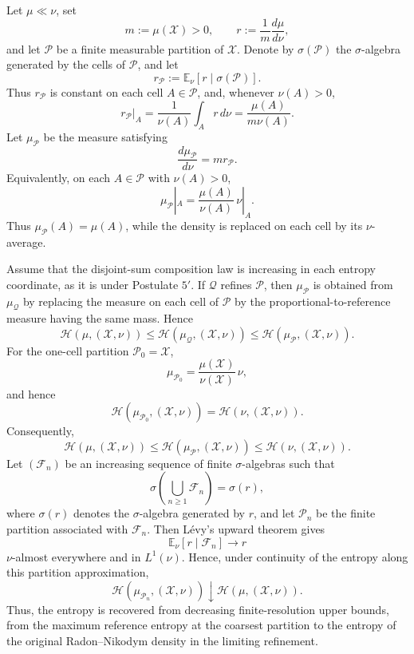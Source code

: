 \documentclass[reqno]{amsart}
\begin{document}
\begin{remark}
Let $\mu\ll\nu$, set
$$
m:=\mu(\mathcal X)>0,
\qquad
r:=\frac{1}{m}\frac{d\mu}{d\nu},
$$
and let $\mathcal P$ be a finite measurable partition of $\mathcal X$. Denote by
$\sigma(\mathcal P)$ the $\sigma$-algebra generated by the cells of $\mathcal P$, and let
$$
r_{\mathcal P}
:=
\mathbb E_\nu
\left[
r\mid\sigma(\mathcal P)
\right].
$$
Thus $r_{\mathcal P}$ is constant on each cell $A\in\mathcal P$, and, whenever
$\nu(A)>0$,
$$
r_{\mathcal P}|_A
=
\frac{1}{\nu(A)}
\int_A r\,d\nu
=
\frac{\mu(A)}{m\nu(A)}.
$$
Let $\mu_{\mathcal P}$ be the measure satisfying
$$
\frac{d\mu_{\mathcal P}}{d\nu}
=
mr_{\mathcal P}.
$$
Equivalently, on each $A\in\mathcal P$ with $\nu(A)>0$,
$$
\mu_{\mathcal P}|_A
=
\frac{\mu(A)}{\nu(A)}\,\nu|_A.
$$
Thus $\mu_{\mathcal P}(A)=\mu(A)$, while the density is replaced on each
cell by its $\nu$-average.

Assume that the disjoint-sum composition law is increasing in each
entropy coordinate, as it is under Postulate $5'$. If $\mathcal Q$
refines $\mathcal P$, then $\mu_{\mathcal P}$ is obtained from
$\mu_{\mathcal Q}$ by replacing the measure on each cell of
$\mathcal P$ by the proportional-to-reference measure having the same
mass. Hence
$$
\mathcal H(\mu,(\mathcal X,\nu))
\leq
\mathcal H(\mu_{\mathcal Q},(\mathcal X,\nu))
\leq
\mathcal H(\mu_{\mathcal P},(\mathcal X,\nu)).
$$
For the one-cell partition $\mathcal P_0={\mathcal X}$,
$$
\mu_{\mathcal P_0}
=
\frac{\mu(\mathcal X)}{\nu(\mathcal X)}\,\nu,
$$
and hence
$$
\mathcal H(\mu_{\mathcal P_0},(\mathcal X,\nu)) =
\mathcal H(\nu,(\mathcal X,\nu)).
$$
Consequently,
$$
\mathcal H(\mu,(\mathcal X,\nu))
\leq
\mathcal H(\mu_{\mathcal P},(\mathcal X,\nu))
\leq
\mathcal H(\nu,(\mathcal X,\nu)).
$$
Let $(\mathcal F_n)$ be an increasing sequence of finite $\sigma$-algebras such that
$$
\sigma\left(\bigcup_{n\geq1}\mathcal F_n\right)=\sigma(r),
$$
where $\sigma(r)$ denotes the $\sigma$-algebra generated by $r$, and let
$\mathcal P_n$ be the finite partition associated with $\mathcal F_n$. Then
L\'evy's upward theorem gives
$$
\mathbb E_\nu[r\mid\mathcal F_n]
\longrightarrow
r
$$
$\nu$-almost everywhere and in $L^1(\nu)$. Hence, under continuity
of the entropy along this partition approximation,
$$
\mathcal H(\mu_{\mathcal P_n},(\mathcal X,\nu))
\downarrow
\mathcal H(\mu,(\mathcal X,\nu)).
$$
Thus, the entropy is recovered from decreasing finite-resolution upper
bounds, from the maximum reference entropy at the coarsest partition to
the entropy of the original Radon--Nikodym density in the limiting
refinement.
\end{remark}
\end{document}
